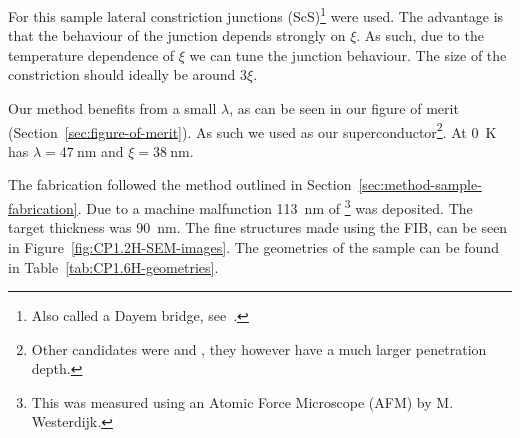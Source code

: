 For this sample lateral constriction junctions (ScS)\footnote{Also called a Dayem bridge, see~\cite{likharevSuperconductingWeakLinks1979}.} were used. The advantage is that the behaviour of the junction depends strongly on $\xi$.\cite{likharevSuperconductingWeakLinks1979} As such, due to the temperature dependence of $\xi$ we can tune the junction behaviour. The size of the constriction should ideally be around $3\xi$.\cite{likharevSuperconductingWeakLinks1979}

Our method benefits from a small $\lambda$, as can be seen in our figure of merit (Section~\ref{sec:figure-of-merit}). As such we used  as our superconductor\footnote{Other candidates were  and , they however have a much larger penetration depth.}. At \qty{0}{\kelvin}  has $\lambda = \qty{47}{\nano\meter}$ and $\xi = \qty{38}{\nano\meter}$.\cite{maxfieldSuperconductingPenetrationDepth1965}

The fabrication followed the method outlined in Section~\ref{sec:method-sample-fabrication}. Due to a machine malfunction \qty{113}{\nano\meter} of \footnote{This was measured using an Atomic Force Microscope (AFM) by M. Westerdijk.} was deposited. The target thickness was \qty{90}{\nano\meter}. The fine structures made using the FIB, can be seen in Figure~\ref{fig:CP1.2H-SEM-images}. The geometries of the sample can be found in Table~\ref{tab:CP1.6H-geometries}.

